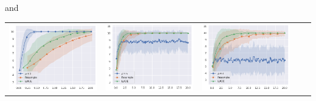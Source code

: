 \begin{frame}{\tcv{} \onemax{} and \leadingones{}}
{\begin{table}
\begin{tabular}{ccccc}
            \includegraphics[width=\figwidth]{images/LUCIE/leadingones/uniform/leading_ones_0_u_fitness.png} &
            \includegraphics[width=\figwidth]{images/LUCIE/leadingones/uniform/leading_ones_100_u_fitness.png} &
            \includegraphics[width=\figwidth]{images/LUCIE/leadingones/uniform/leading_ones_200_u_fitness.png}\\

\end{tabular}
\end{table}}
\end{frame}
